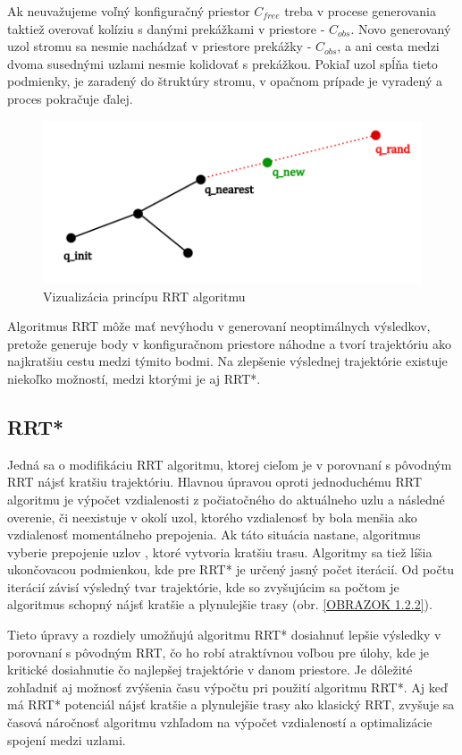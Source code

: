 Ak neuvažujeme voľný konfiguračný priestor $C_{free}$ treba v procese generovania taktiež overovať kolíziu s danými prekážkami v priestore - $C_{obs}$. Novo generovaný uzol stromu sa nesmie nachádzať v priestore prekážky - $C_{obs}$, a ani cesta medzi dvoma susednými uzlami nesmie kolidovať s prekážkou. Pokiaľ uzol spĺňa tieto podmienky, je zaradený do štruktúry stromu, v opačnom prípade je vyradený a proces pokračuje ďalej.

\begin{figure}[h]
	\centering
	\includegraphics[width=120mm]{img/RRT1.png}
	\caption{Vizualizácia princípu RRT algoritmu }\label{OBRAZOK 2.1} 
\end{figure}    

Algoritmus RRT môže mať nevýhodu v generovaní neoptimálnych výsledkov, pretože generuje body v konfiguračnom priestore náhodne a tvorí trajektóriu ako najkratšiu cestu medzi týmito bodmi. Na zlepšenie výslednej trajektórie existuje niekoľko možností, medzi ktorými je aj RRT*.

\subsection{RRT*}
\label{kap:2.2}

Jedná sa o modifikáciu RRT algoritmu, ktorej cieľom je v porovnaní s pôvodným RRT nájsť kratšiu trajektóriu. Hlavnou úpravou oproti jednoduchému RRT algoritmu je výpočet vzdialenosti z počiatočného do aktuálneho uzlu a následné overenie, či neexistuje v okolí uzol, ktorého vzdialenosť by bola menšia ako vzdialenosť momentálneho prepojenia. Ak táto situácia nastane, algoritmus vyberie prepojenie uzlov , ktoré vytvoria kratšiu trasu. Algoritmy sa tiež líšia ukončovacou podmienkou, kde pre RRT* je určený jasný počet iterácií. Od počtu iterácií závisí výsledný tvar trajektórie, kde so zvyšujúcim sa počtom je algoritmus schopný nájsť kratšie a plynulejšie trasy (obr. \ref{OBRAZOK 1.2.2}).

Tieto úpravy a rozdiely umožňujú algoritmu RRT* dosiahnuť lepšie výsledky v porovnaní s pôvodným RRT, čo ho robí atraktívnou voľbou pre úlohy, kde je kritické dosiahnutie čo najlepšej trajektórie v danom priestore. Je dôležité zohľadniť aj možnosť zvýšenia času výpočtu pri použití algoritmu RRT*. Aj keď má RRT* potenciál nájsť kratšie a plynulejšie trasy ako klasický RRT, zvyšuje sa časová náročnosť algoritmu vzhľadom na výpočet vzdialeností a optimalizácie spojení medzi uzlami.

